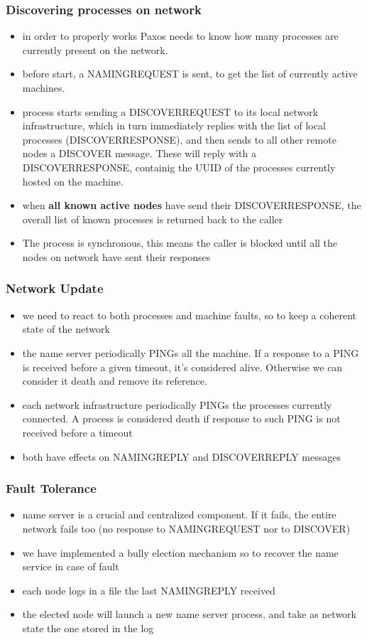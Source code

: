 \documentclass{beamer}
\begin{document}
\begin{frame}
  \frametitle{Discovering processes on network}
  \begin{itemize}
  \item in order to properly works Paxos needs to know how many processes are currently present on the network.
  \item before start, a NAMINGREQUEST is sent, to get the list of currently active machines.
  \item process starts sending a DISCOVERREQUEST to its local network infrastructure, which in turn immediately replies with the list of local processes (DISCOVERRESPONSE), and then sends to all other remote nodes a DISCOVER message. These will reply with a DISCOVERRESPONSE, containig the UUID of the processes currently hosted on the machine.
  \item when \textbf{all known active nodes} have send their DISCOVERRESPONSE, the overall list of known processes is returned back to the caller
  \item The process is synchronous, this means the caller is blocked until all the nodes on network have sent their responses
  \end{itemize}
\end{frame}

\begin{frame}
  \frametitle{Network Update}
  \begin{itemize}
  \item we need to react to both processes and machine faults, so to keep a coherent state of the network
  \item the name server periodically PINGs all the machine. If a response to a PING is received before a given timeout, it's considered alive. Otherwise we can consider it death and remove its reference.
  \item each network infrastructure periodically PINGs the processes currently connected. A process is considered death if response to such PING is not received before a timeout
  \item both have effects on NAMINGREPLY and DISCOVERREPLY messages
  \end{itemize}
\end{frame}

\begin{frame}
  \frametitle{Fault Tolerance}
  \begin{itemize}
  \item name server is a crucial and centralized component. If it fails, the entire network fails too (no response to NAMINGREQUEST nor to DISCOVER)
  \item we have implemented a bully election mechanism so to recover the name service in case of fault
  \item each node logs in a file the last NAMINGREPLY received
  \item the elected node will launch a new name server process, and take as network state the one stored in the log
  \end{itemize}
\end{frame}
\end{document}
